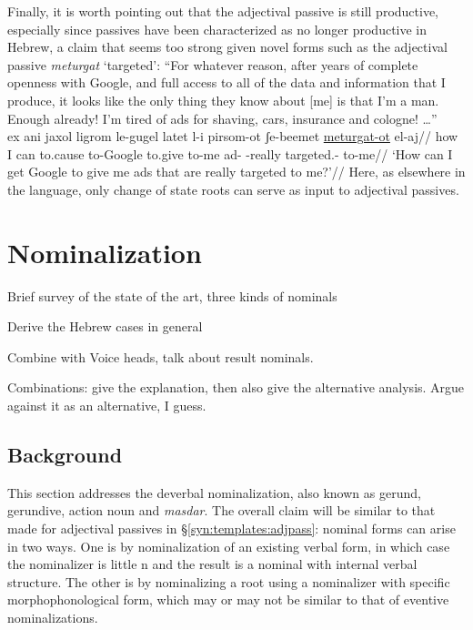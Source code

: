 Finally, it is worth pointing out that {the adjectival passive} is still productive, especially since passives have been characterized as no longer productive in Hebrew, a claim that seems too strong given novel forms such as{ the adjectival passive} \emph{meturgat} `targeted':
\ex ``For whatever reason, after years of complete openness with Google, and full access to all of the data and information that I produce, it looks like the only thing they know about [me] is that I'm a man. Enough already! I'm tired of ads for shaving, cars, insurance and cologne! \dots ''\\
	\begingl
		\gla ex ani jaxol ligrom le-gugel latet l-i pirsom-ot ʃe-beemet \underline{meturgat-ot} el-aj//
		\glb how I can to.cause to-Google to.give to-me ad- -really targeted.- to-me//
		\glft `How can I get Google to give me ads that are really targeted to me?'//
	\endgl
\xe
Here, as elsewhere in the language, only change of state roots can serve as input to adjectival passives.



\section{Nominalization} \label{passn:n}
Brief survey of the state of the art, three kinds of nominals

Derive the Hebrew cases in general

Combine with Voice heads, talk about result nominals.

Combinations: give the \cite{ahdoutkastner18} explanation, then also give the {\vz} alternative analysis. Argue against it as an alternative, I guess.

	\subsection{Background}

This section addresses the deverbal nominalization, also known as gerund, gerundive, action noun and \emph{masdar}. The overall claim will be similar to that made for adjectival passives in \S\ref{syn:templates:adjpass}: nominal forms can arise in two ways. One is by nominalization of an existing verbal form, in which case the nominalizer is little n and the result is a nominal with internal verbal structure. The other is by nominalizing a root using a nominalizer with specific morphophonological form, which may or may not be similar to that of eventive nominalizations.

